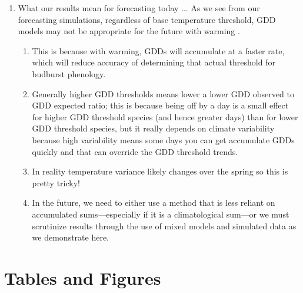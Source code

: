 \documentclass{article}\usepackage[]{graphicx}\usepackage[]{color}
\begin{document}
\begin{enumerate}
  \item What our results mean for forecasting today ... As we see from our forecasting simulations, regardless of base temperature threshold, GDD models may not be appropriate for the future with warming \citep{Man2010}. 
  \begin{enumerate} 
    \item This is because with warming, GDDs will accumulate at a faster rate, which will reduce accuracy of determining that actual threshold for budburst phenology. 
  \item Generally higher GDD thresholds means lower a lower GDD observed to GDD expected ratio; this is because being off by a day is a small effect for higher GDD threshold species (and hence greater days) than for lower GDD threshold species, but it really depends on climate variability because high variability means some days you can get accumulate GDDs quickly and that can override the GDD threshold trends. 
  \item In reality temperature variance likely changes over the spring so this is pretty tricky! 
  \item In the future, we need to either use a method that is less reliant on accumulated sums---especially if it is a climatological sum---or we must scrutinize results through the use of mixed models and simulated data as we demonstrate here.
  \end{enumerate}
\end{enumerate}





\section*{Tables and Figures}
\end{document}
